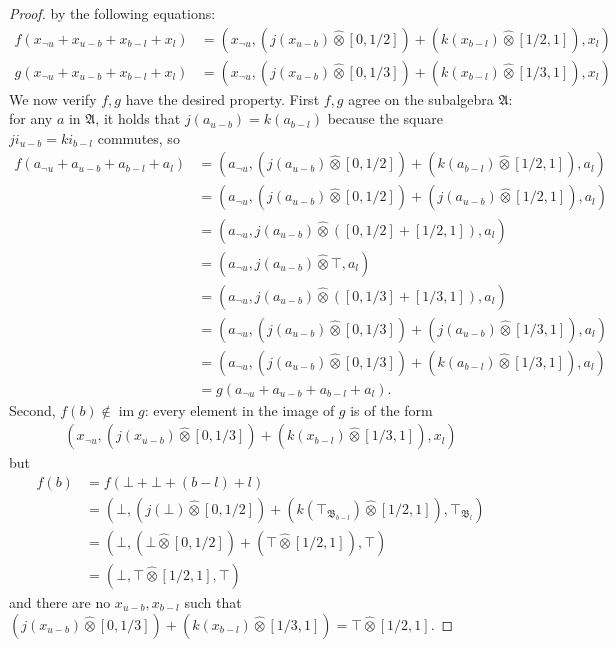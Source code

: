 \documentclass[
  sigconf,
  screen, ]{acmart}
\theoremstyle{definition}
\newcommand\img{\operatorname{im}}
\newcommand\frakA{\mathfrak A}
\newcommand\frakB{\mathfrak B}
\newcommand\lmafp{\mathbin{\hat\otimes}}
\begin{document}
\begin{proof}
  by the following equations:
  \begin{align*}
    f(x_{\neg u} +x_{u-b} + x_{b-l} + x_l) &= (x_{\neg u}, (j(x_{u-b})\lmafp[0,1/2]) + (k(x_{b-l})\lmafp[1/2,1]), x_l) \\
    g(x_{\neg u} +x_{u-b} + x_{b-l} + x_l) &= (x_{\neg u}, (j(x_{u-b})\lmafp[0,1/3]) + (k(x_{b-l})\lmafp[1/3,1]), x_l)
  \end{align*}
  We now verify $f,g$ have the desired property.
  First $f,g$ agree on the subalgebra $\frakA$:
  for any $a$ in $\frakA$, it holds that $j(a_{u-b}) = k(a_{b-l})$
  because the square $ji_{u-b} = ki_{b-l}$ commutes, so
  \begin{align*}
    f(a_{\neg u} + a_{u-b} + a_{b-l} + a_l)
    &= (a_{\neg u}, (j(a_{u-b})\lmafp[0,1/2]) + (k(a_{b-l})\lmafp[1/2,1]), a_l) \\
    &= (a_{\neg u}, (j(a_{u-b})\lmafp[0,1/2]) + (j(a_{u-b})\lmafp[1/2,1]), a_l) \\
    &= (a_{\neg u}, j(a_{u-b})\lmafp([0,1/2]+[1/2,1]), a_l) \\
    &= (a_{\neg u}, j(a_{u-b})\lmafp \top, a_l) \\
    &= (a_{\neg u}, j(a_{u-b})\lmafp([0,1/3]+[1/3,1]), a_l) \\
    &= (a_{\neg u}, (j(a_{u-b})\lmafp[0,1/3]) + (j(a_{u-b})\lmafp[1/3,1]), a_l) \\
    &= (a_{\neg u}, (j(a_{u-b})\lmafp[0,1/3]) + (k(a_{b-l})\lmafp[1/3,1]), a_l) \\
    &= g(a_{\neg u} +a_{u-b} + a_{b-l} + a_l).
  \end{align*}
  Second, $f(b)\notin\img g$:
  every element in the image of $g$ is of the form
  \begin{align*}
    (x_{\neg u}, (j(x_{u-b})\lmafp[0,1/3]) + (k(x_{b-l})\lmafp[1/3,1]), x_l)
  \end{align*}
  but
  \begin{align*}
    f(b)
    &= f(\bot + \bot + (b-l) + l)\\
    &= (\bot, (j(\bot)\lmafp[0,1/2]) + (k(\top_{\frakB_{b-l}})\lmafp[1/2,1]), \top_{\frakB_l}) \\
    &= (\bot, (\bot\lmafp[0,1/2]) + (\top\lmafp[1/2,1]), \top) \\
    &= (\bot, \top\lmafp[1/2,1], \top)
  \end{align*}
  and there are no $x_{u-b},x_{b-l}$
  such that $(j(x_{u-b})\lmafp[0,1/3]) + (k(x_{b-l})\lmafp[1/3,1]) = \top\lmafp[1/2,1]$.
\end{proof}
\end{document}
